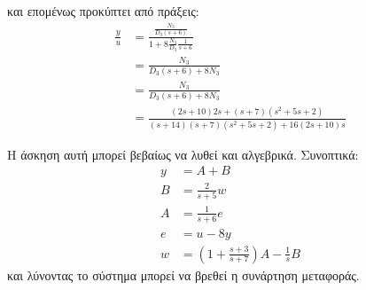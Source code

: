 \documentclass[11pt,a4paper,notitlepage,fleqn]{article}
\begin{document}
\begin{exercise}[2.19]
και επομένως προκύπτει από πράξεις:
\begin{align*}
	\frac{y}{u} &=
	\frac{\frac{N_3}{D_3(s+6)}}{1+8\frac{N_3}{D_3}\frac{1}{s+6}}
	\\ &= \frac{N_3}{D_3(s+6)+8N_3}
	\\ &= \frac{N_3}{D_3(s+6)+8N_3}
	\\ &= \frac{
		(2s+10)2s+(s+7)(s^2+5s+2)
		}{
		(s+14)(s+7)(s^2+5s+2)+16(2s+10)s
		}
\end{align*}

Η άσκηση αυτή μπορεί βεβαίως να λυθεί και αλγεβρικά. Συνοπτικά:
\begin{align}
	y &= A + B \label{ex.2.19.1} \\
	B &= \frac{2}{s+5}w \label{ex.2.19.2} \\
	A &= \frac{1}{s+6}e \label{ex.2.19.3} \\
	e &= u-8y \label{3x.2.19.4} \\
	w &= \left(1+\frac{s+3}{s+7}\right)A - \frac{1}{s}B \label{ex.2.19.5}
\end{align}
και λύνοντας το σύστημα μπορεί να βρεθεί η συνάρτηση μεταφοράς.

\end{exercise}
\end{document}
